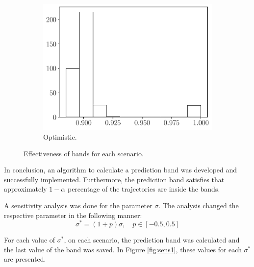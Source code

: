 \documentclass[11pt]{article}
\theoremstyle{definition}
\theoremstyle{remark}
\theoremstyle{remark}
\begin{document}
\begin{figure}
\begin{subfigure}[b]{0.45\textwidth}
      \includegraphics[scale=0.45]{eff_opti.pdf}
      \caption{Optimistic.}
  \end{subfigure}
  \caption{Effectiveness of bands for each scenario.}
  \label{fig:eff1}
\end{figure}

In conclusion, an algorithm to calculate a prediction band was
developed and successfully implemented. Furthermore, the prediction
band satisfies that approximately $1 - \alpha$ percentage of the
trajectories are inside the bands.

A sensitivity analysis was done for the parameter $\sigma$. The
analysis changed the respective parameter in the following manner:
\begin{equation*}
  \sigma^* = (1 + p)\sigma, \quad p \in [-0.5, 0.5]
\end{equation*}

For each value of $\sigma^*$, on each scenario, the prediction band
was calculated and the last value of the band was saved. In Figure
\ref{fig:sens1}, these values for each $\sigma^*$ are presented.
\end{document}
